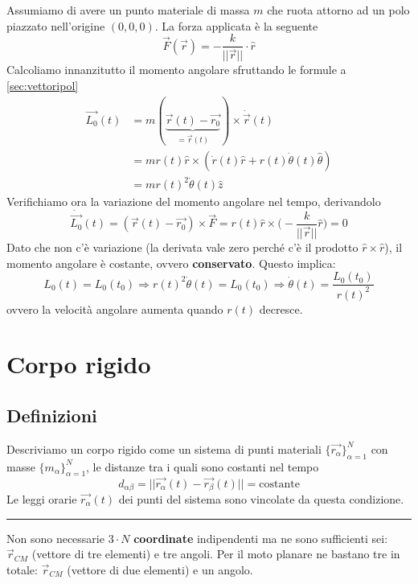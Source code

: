 \begin{example}
	Assumiamo di avere un punto materiale di massa $m$ che ruota attorno ad un polo piazzato nell'origine $(0, 0, 0)$. La forza applicata è la seguente
	\begin{equation*}
		\vec{F}(\vec{r}) = -\frac{k}{\lvert\lvert \vec{r} \rvert\rvert} \cdot \widehat{r}
	\end{equation*}
	Calcoliamo innanzitutto il momento angolare sfruttando le formule a \ref{sec:vettoripol}
	\begin{align*}
		\vec{L_0}(t) &= m(\underbrace{\vec{r}(t)-\vec{r_0}}_{= \vec{r}(t)}) \times \dot{\vec{r}} (t) \\
		& = m r(t) \widehat{r} \times (\dot{r}(t) \widehat{r} + r(t)\dot{\theta}(t) \widehat{\theta}) \\
		& = mr(t)^2\dot{\theta}(t) \widehat{z}
	\end{align*}
	Verifichiamo ora la variazione del momento angolare nel tempo, derivandolo
	\begin{equation*}
		\dot{\vec{L_0}}(t) = (\vec{r}(t) -  \vec{r_0}) \times \vec{F} = r(t) \widehat{r} \times \bigg(-\frac{k}{\lvert\lvert \vec{r} \rvert\rvert}\widehat{r}\bigg) = 0
	\end{equation*}
	Dato che non c'è variazione (la derivata vale zero perché c'è il prodotto $\widehat{r} \times \widehat{r}$), il momento angolare è costante, ovvero \textbf{conservato}. Questo implica:
	\begin{equation*}
		L_0(t) = L_0(t_0) \Longrightarrow r(t)^2\dot{\theta}(t) = L_0(t_0) \Longrightarrow \dot{\theta}(t) = \frac{L_0(t_0)}{r(t)^2}
	\end{equation*}
	ovvero la velocità angolare aumenta quando $r(t)$ decresce.
\end{example}

\newpage
\section{Corpo rigido}
\subsection{Definizioni}
\begin{definition}
	Descriviamo un corpo rigido come un sistema di punti materiali $\{\vec{r_\alpha}\}^N_{\alpha=1}$ con masse $\{m_\alpha\}^N_{\alpha=1}$, le distanze tra i quali sono costanti nel tempo
	\begin{equation}
		d_{\alpha\beta} = \lvert\lvert \vec{r_\alpha}(t) - \vec{r_\beta}(t) \rvert\rvert = \text{costante}
	\end{equation}
	Le leggi orarie $\vec{r_\alpha}(t)$ dei punti del sistema sono vincolate da questa condizione.
\end{definition}
\noindent\rule[0.5ex]{\linewidth}{.5pt}
Non sono necessarie $3 \cdot N$ \textbf{coordinate} indipendenti ma ne sono sufficienti sei: $\vec{r}_{CM}$ (vettore di tre elementi) e tre angoli. Per il moto planare ne bastano tre in totale: $\vec{r}_{CM}$ (vettore di due elementi) e un angolo.

